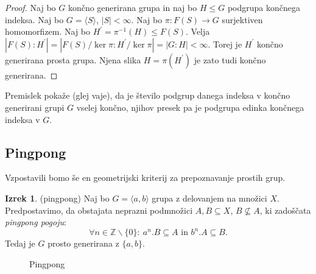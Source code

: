 \documentclass[11pt]{book}
\def\ZZ{\mathbb{Z}}
\def\literatura{\color{modra}}
\def\vaje{{\literatura (glej vaje)}}
\theoremstyle{definition}
\theoremstyle{zgled}
\theoremstyle{odprtproblem}
\theoremstyle{domacanaloga}
\newenvironment{dokaz}
    {\color{siva}\begin{proof}}
    {\end{proof}}
\theoremstyle{izrek}
\newtheorem*{izrek}{Izrek}
\begin{document}
\begin{dokaz}
Naj bo $G$ končno generirana grupa in naj bo $H \leq G$ podgrupa končnega indeksa. Naj bo $G = \langle S \rangle$, $|S| < \infty$.  Naj bo $\pi \colon F(S) \to G$ surjektiven homomorfizem. Naj bo $H^\prime = \pi^{-1}(H) \leq F(S)$. Velja $|F(S) : H^\prime| = |F(S)/\ker \pi : H^\prime/\ker \pi| = |G : H| < \infty$. Torej je $H^\prime$ končno generirana prosta grupa. Njena slika $H = \pi(H^\prime)$ je zato tudi končno generirana.
\end{dokaz}

Premislek pokaže \vaje, da je število podgrup danega indeksa v končno generirani grupi $G$ vselej končno, njihov presek pa je podgrupa edinka končnega indeksa v $G$.

\subsection{Pingpong}

Vzpostavili bomo še en geometrijski kriterij za prepoznavanje prostih grup. 

\begin{izrek}{\sc (pingpong)}
Naj bo $G = \langle a,b \rangle$ grupa z delovanjem na množici $X$. Predpostavimo, da obstajata neprazni podmnožici $A,B \subseteq X$, $B \not\subseteq A$, ki zadoščata {\em pingpong pogoju}:
\[
\forall n \in \ZZ \backslash \{ 0 \} \colon \ a^n.B \subseteq A \text{ in } b^n.A \subseteq B.
\]
Tedaj je $G$ prosto generirana z $\{ a, b \}$.
\end{izrek}

\begin{figure}[t]
\centering
{}
\caption{Pingpong}
\end{figure}
\end{document}
